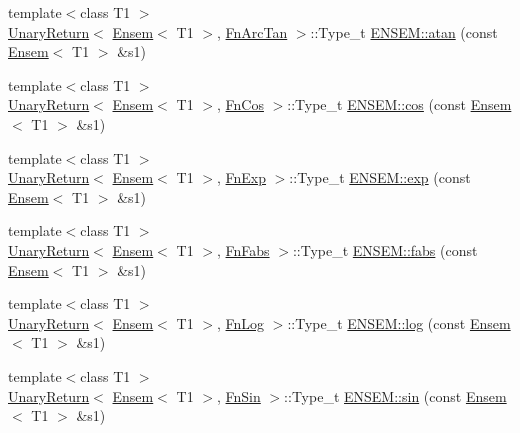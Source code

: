 \begin{DoxyCompactItemize}
\item 
{\footnotesize template$<$class T1 $>$ }\\\mbox{\hyperlink{structENSEM_1_1UnaryReturn}{Unary\+Return}}$<$ \mbox{\hyperlink{classENSEM_1_1Ensem}{Ensem}}$<$ T1 $>$, \mbox{\hyperlink{structENSEM_1_1FnArcTan}{Fn\+Arc\+Tan}} $>$\+::Type\+\_\+t \mbox{\hyperlink{group__eensem_gaa9d40be37b4214b6c8f1e94f6a52dea3}{E\+N\+S\+E\+M\+::atan}} (const \mbox{\hyperlink{classENSEM_1_1Ensem}{Ensem}}$<$ T1 $>$ \&s1)
\item 
{\footnotesize template$<$class T1 $>$ }\\\mbox{\hyperlink{structENSEM_1_1UnaryReturn}{Unary\+Return}}$<$ \mbox{\hyperlink{classENSEM_1_1Ensem}{Ensem}}$<$ T1 $>$, \mbox{\hyperlink{structENSEM_1_1FnCos}{Fn\+Cos}} $>$\+::Type\+\_\+t \mbox{\hyperlink{group__eensem_gac1023736758024ac0b3d64cf9021b716}{E\+N\+S\+E\+M\+::cos}} (const \mbox{\hyperlink{classENSEM_1_1Ensem}{Ensem}}$<$ T1 $>$ \&s1)
\item 
{\footnotesize template$<$class T1 $>$ }\\\mbox{\hyperlink{structENSEM_1_1UnaryReturn}{Unary\+Return}}$<$ \mbox{\hyperlink{classENSEM_1_1Ensem}{Ensem}}$<$ T1 $>$, \mbox{\hyperlink{structENSEM_1_1FnExp}{Fn\+Exp}} $>$\+::Type\+\_\+t \mbox{\hyperlink{group__eensem_ga98866485949365e5677de99a9cbe2a93}{E\+N\+S\+E\+M\+::exp}} (const \mbox{\hyperlink{classENSEM_1_1Ensem}{Ensem}}$<$ T1 $>$ \&s1)
\item 
{\footnotesize template$<$class T1 $>$ }\\\mbox{\hyperlink{structENSEM_1_1UnaryReturn}{Unary\+Return}}$<$ \mbox{\hyperlink{classENSEM_1_1Ensem}{Ensem}}$<$ T1 $>$, \mbox{\hyperlink{structENSEM_1_1FnFabs}{Fn\+Fabs}} $>$\+::Type\+\_\+t \mbox{\hyperlink{group__eensem_ga6639ef2f6996bfe1d8daa6ba09d52acb}{E\+N\+S\+E\+M\+::fabs}} (const \mbox{\hyperlink{classENSEM_1_1Ensem}{Ensem}}$<$ T1 $>$ \&s1)
\item 
{\footnotesize template$<$class T1 $>$ }\\\mbox{\hyperlink{structENSEM_1_1UnaryReturn}{Unary\+Return}}$<$ \mbox{\hyperlink{classENSEM_1_1Ensem}{Ensem}}$<$ T1 $>$, \mbox{\hyperlink{structENSEM_1_1FnLog}{Fn\+Log}} $>$\+::Type\+\_\+t \mbox{\hyperlink{group__eensem_gade72fe6a4a31fa197d470c2ea6ce63a8}{E\+N\+S\+E\+M\+::log}} (const \mbox{\hyperlink{classENSEM_1_1Ensem}{Ensem}}$<$ T1 $>$ \&s1)
\item 
{\footnotesize template$<$class T1 $>$ }\\\mbox{\hyperlink{structENSEM_1_1UnaryReturn}{Unary\+Return}}$<$ \mbox{\hyperlink{classENSEM_1_1Ensem}{Ensem}}$<$ T1 $>$, \mbox{\hyperlink{structENSEM_1_1FnSin}{Fn\+Sin}} $>$\+::Type\+\_\+t \mbox{\hyperlink{group__eensem_ga7c76c7e409f4cb0cb13cdb648ac99814}{E\+N\+S\+E\+M\+::sin}} (const \mbox{\hyperlink{classENSEM_1_1Ensem}{Ensem}}$<$ T1 $>$ \&s1)

\end{DoxyCompactItemize}
